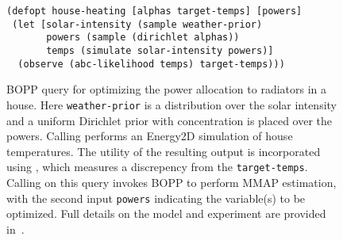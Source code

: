 \begin{figure}[t]
	\vspace{5pt}
	\begin{lstlisting}[basicstyle=\ttfamily\small]
(defopt house-heating [alphas target-temps] [powers]
 (let [solar-intensity (sample weather-prior)
       powers (sample (dirichlet alphas))
       temps (simulate solar-intensity powers)]
  (observe (abc-likelihood temps) target-temps)))
	\end{lstlisting}	
	\vspace{-6pt}
	\caption{BOPP query for optimizing the power allocation to radiators in a house.  Here \lstinline{weather-prior} is a distribution over the solar intensity and a uniform Dirichlet prior with concentration  is placed over the powers. Calling \simulatec performs an Energy2D simulation of house temperatures. The utility of the resulting output is incorporated using \abcl, which measures a discrepency from the \texttt{target-temps}. Calling \doopt on this query invokes BOPP to perform MMAP estimation, with the second input \lstinline{powers} indicating the variable(s) to be optimized. Full details on the model and
		experiment are provided in~\cite{rainforth2017boppArxiv}.\label{fig:house-heating-code}}
	\vspace{-5pt}
\end{figure}


